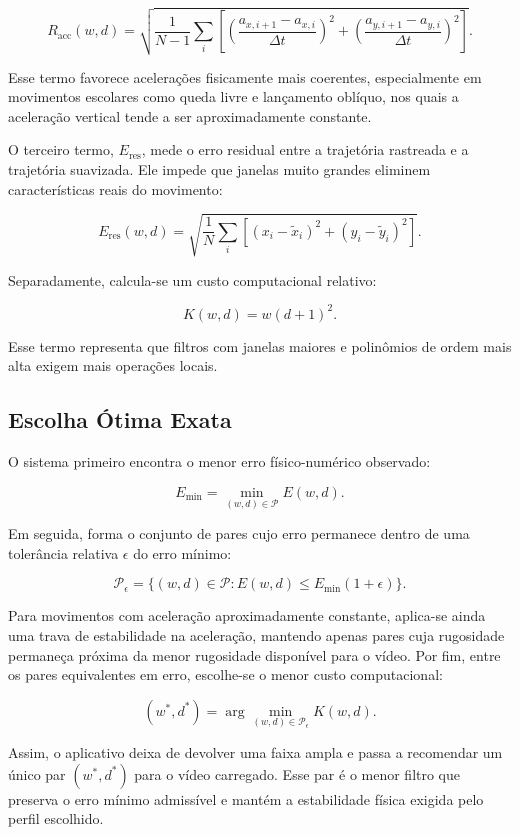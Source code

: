 \[
    R_{\text{acc}}(w,d)
    =
    \sqrt{
    \frac{1}{N-1}
    \sum_{i}
    \left[
    \left(\frac{a_{x,i+1}-a_{x,i}}{\Delta t}\right)^2
    +
    \left(\frac{a_{y,i+1}-a_{y,i}}{\Delta t}\right)^2
    \right]
    }.
\]

Esse termo favorece acelerações fisicamente mais coerentes, especialmente em movimentos escolares como queda livre e lançamento oblíquo, nos quais a aceleração vertical tende a ser aproximadamente constante.

O terceiro termo, $E_{\text{res}}$, mede o erro residual entre a trajetória rastreada e a trajetória suavizada. Ele impede que janelas muito grandes eliminem características reais do movimento:

\[
    E_{\text{res}}(w,d)
    =
    \sqrt{
    \frac{1}{N}
    \sum_i
    \left[
    (x_i-\tilde{x}_i)^2+
    (y_i-\tilde{y}_i)^2
    \right]
    }.
\]

Separadamente, calcula-se um custo computacional relativo:

\[
    K(w,d)=w(d+1)^2.
\]

Esse termo representa que filtros com janelas maiores e polinômios de ordem mais alta exigem mais operações locais.

\subsection{Escolha Ótima Exata}

O sistema primeiro encontra o menor erro físico-numérico observado:

\[
    E_{\min}=\min_{(w,d)\in\mathcal{P}} E(w,d).
\]

Em seguida, forma o conjunto de pares cujo erro permanece dentro de uma tolerância relativa $\epsilon$ do erro mínimo:

\[
    \mathcal{P}_{\epsilon}
    =
    \{(w,d)\in\mathcal{P}: E(w,d)\leq E_{\min}(1+\epsilon)\}.
\]

Para movimentos com aceleração aproximadamente constante, aplica-se ainda uma trava de estabilidade na aceleração, mantendo apenas pares cuja rugosidade permaneça próxima da menor rugosidade disponível para o vídeo. Por fim, entre os pares equivalentes em erro, escolhe-se o menor custo computacional:

\[
    (w^\ast,d^\ast)
    =
    \arg\min_{(w,d)\in\mathcal{P}_{\epsilon}} K(w,d).
\]

Assim, o aplicativo deixa de devolver uma faixa ampla e passa a recomendar um único par $(w^\ast,d^\ast)$ para o vídeo carregado. Esse par é o menor filtro que preserva o erro mínimo admissível e mantém a estabilidade física exigida pelo perfil escolhido.


